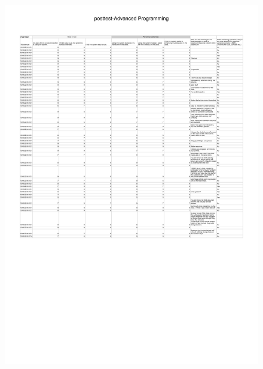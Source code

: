 \begin{figure}[H]
  \centering
    \includegraphics[scale=0.75,angle=90]{sections/appendicies/data2.pdf}
    \caption*{}
\end{figure}

